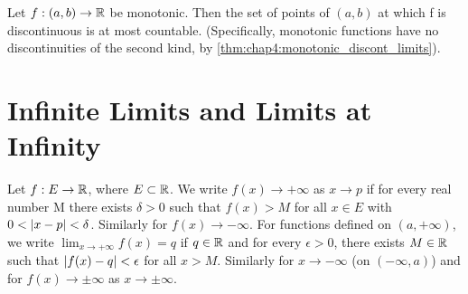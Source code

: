 \begin{theorem} %
  \label{thm:chap4:monotonic_discont_type}
  Let $f: (a, b) \to \mathbb{R}$ be monotonic. Then the set of points of
  $(a, b)$ at which f is discontinuous is at most countable.
  (Specifically, monotonic functions have no discontinuities of the
  second kind, by \autoref{thm:chap4:monotonic_discont_limits}).
\end{theorem}

\section{Infinite Limits and Limits at Infinity}
\label{sec:chap4:infinite_limits}

\begin{definition} %
  \label{def:chap4:infinite_limit_defs}
  Let $f: E \to \mathbb{R}$, where $E \subset \mathbb{R}$. We write $f(x) \to
  +\infty$ as $x \to p$ if for every real number M there exists
  $\delta > 0$ such that $f(x) > M$ for all $x \in E$ with $0 <
  \left\lvert x-p \right\rvert < \delta$. Similarly for $f(x) \to -\infty$.
  For functions defined on $(a, +\infty)$, we write $\lim_{x \to
  +\infty} f(x) = q$ if $q \in \mathbb{R}$ and for every $\epsilon > 0$,
  there exists $M \in \mathbb{R}$ such that $\left\lvert f(x) - q \right\rvert < \epsilon$ for
  all $x > M$. Similarly for $x \to -\infty$ (on $(-\infty, a)$) and
  for $f(x) \to \pm\infty$ as $x \to \pm\infty$.
\end{definition}



